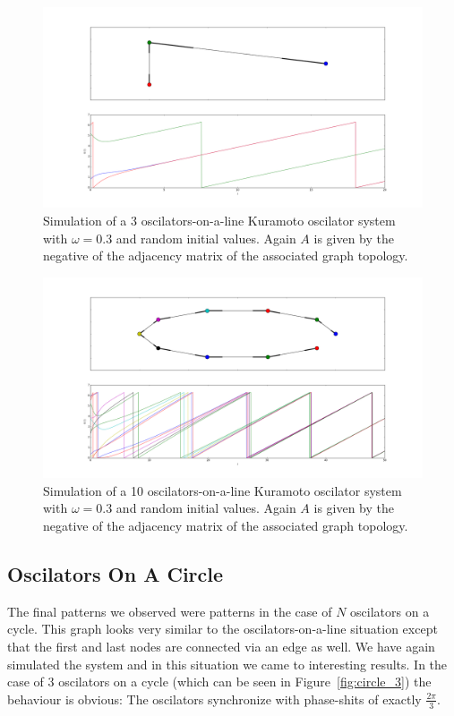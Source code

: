 \begin{figure}[h]
  \centering
  \includegraphics[width=\textwidth]{imgs/line_3}
  \caption{Simulation of a 3 oscilators-on-a-line Kuramoto oscilator system with $\omega = 0.3$ and random initial values. Again $A$ is given by the negative of the adjacency matrix of the associated graph topology. }
  \label{fig:line_3}
\end{figure}

\begin{figure}[h]
  \centering
  \includegraphics[width=\textwidth]{imgs/line_10}
  \caption{Simulation of a 10 oscilators-on-a-line Kuramoto oscilator system with $\omega = 0.3$ and random initial values. Again $A$ is given by the negative of the adjacency matrix of the associated graph topology. }
  \label{fig:line_10}
\end{figure}

\subsection{Oscilators On A Circle}

The final patterns we observed were patterns in the case of $N$ oscilators on a cycle. This graph looks very similar to the oscilators-on-a-line situation except that the first and last nodes are connected via an edge as well. We have again simulated the system and in this situation we came to interesting results. In the case of $3$ oscilators on a cycle (which can be seen in Figure~\ref{fig:circle_3}) the behaviour is obvious: The oscilators synchronize with phase-shits of exactly $\frac{2 \pi}{3}$. 

